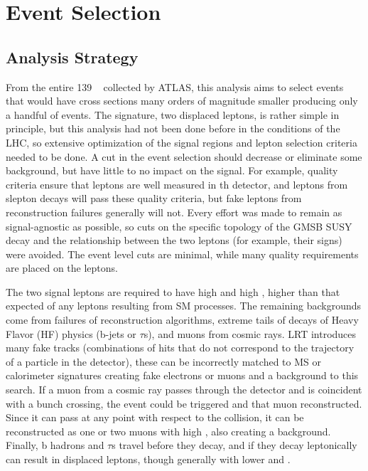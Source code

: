 \chapter{Event Selection}
\label{chap:eventselection}

\section{Analysis Strategy}

From the entire 139 \ifb~ collected by \ac{ATLAS}, this analysis aims to select events that would have cross sections many orders of magnitude smaller producing only a handful of events. The signature, two displaced leptons, is rather simple in principle, but this analysis had not been done before in the conditions of the \ac{LHC}, so extensive optimization of the signal regions and lepton selection criteria needed to be done. A cut in the event selection should decrease or eliminate some background, but have little to no impact on the signal. For example, quality criteria ensure that leptons are well measured in th detector, and leptons from slepton decays will pass these quality criteria, but fake leptons from reconstruction failures generally will not. Every effort was made to remain as signal-agnostic as possible, so cuts on the specific topology of the \ac{GMSB} \ac{SUSY} decay and the relationship between the two leptons (for example, their signs) were avoided. The event level cuts are minimal, while many quality requirements are placed on the leptons.

The two signal leptons are required to have high \pt and high \absdz, higher than that expected of any leptons resulting from \ac{SM} processes. The remaining backgrounds come from failures of reconstruction algorithms, extreme tails of decays of Heavy Flavor (HF) physics (b-jets or $\tau$s), and muons from cosmic rays. \ac{LRT} introduces many fake tracks (combinations of hits that do not correspond to the trajectory of a particle in the detector), these can be incorrectly matched to \ac{MS} or calorimeter signatures creating fake electrons or muons and a background to this search. If a muon from a cosmic ray passes through the detector and is coincident with a bunch crossing, the event could be triggered and that muon reconstructed. Since it can pass at any point with respect to the collision, it can be reconstructed as one or two muons with high \absdz, also creating a background. Finally, b hadrons and $\tau$s travel before they decay, and if they decay leptonically can result in displaced leptons, though generally with lower \pt and \absdz. 


